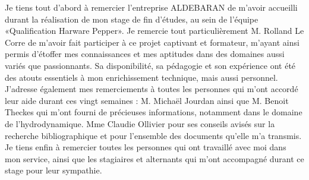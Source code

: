 Je tiens tout d’abord à remercier l’entreprise ALDEBARAN de m’avoir accueilli durant la réalisation de mon stage de fin d'études, au sein de l'équipe «Qualification Harware Pepper».
Je remercie tout particulièrement M. Rolland Le Corre de m’avoir fait participer à ce projet captivant et formateur, m’ayant ainsi permis d’étoffer mes connaissances et mes aptitudes dans des domaines aussi variés que passionnants. Sa disponibilité, sa pédagogie et son expérience ont été des atouts essentiels à mon enrichissement technique, mais aussi personnel.
J’adresse également mes remerciements à toutes les personnes qui m’ont accordé leur aide durant ces vingt semaines :
M. Michaël Jourdan ainsi que M. Benoit Theckes qui m’ont fourni de précieuses informations, notamment dans le domaine de l’hydrodynamique.
Mme Claudie Ollivier pour ses conseils avisés sur la recherche bibliographique et pour l’ensemble des documents qu’elle m’a transmis.
Je tiens enfin à remercier toutes les personnes qui ont travaillé avec moi dans mon service, ainsi que les stagiaires et alternants qui m’ont accompagné durant ce stage pour leur sympathie.